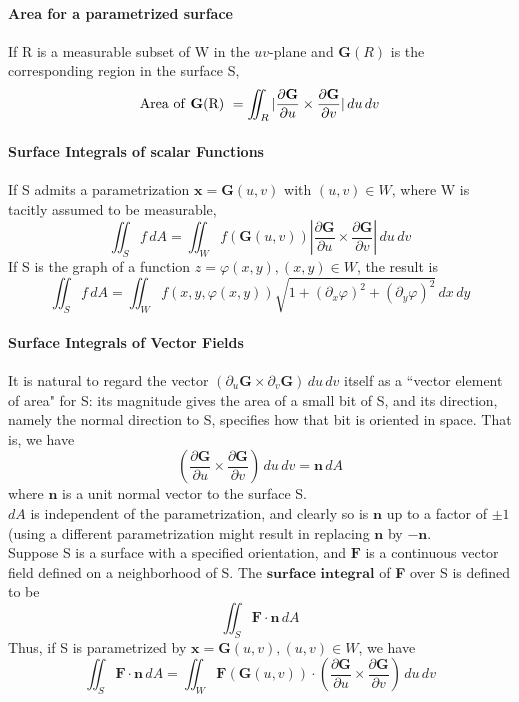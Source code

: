 \documentclass[11pt]{article}
\newcommand{\tb}[1]{\textbf{#1}}
\newcommand{\vx}[0]{\tb{x}}
\begin{document}
\paragraph{Area for a parametrized surface}
If R is a measurable subset of W in the $uv$-plane and $\tb{G}(R)$ is the corresponding region in the surface S,
$$\mbox{Area of \tb{G}(R) } = \iint_R|\frac{\partial \tb{G}}{\partial u} \times \frac{\partial \tb{G}}{\partial v}| \, du\, dv$$
\paragraph{Surface Integrals of scalar Functions}
If S admits a parametrization $\vx = \tb{G}(u,v)$ with $(u,v)\in W$, where W is tacitly assumed to be measurable,
$$\iint_S f \, dA = \iint_W f(\tb{G}(u,v))|\frac{\partial \tb{G}}{\partial u}\times \frac{\partial \tb{G}}{\partial v}| \, du\, dv$$
If S is the graph of a function $z = \varphi(x, y), (x,y) \in W$, the result is
$$\iint_S f\, dA = \iint_W f(x,y,\varphi(x,y))\sqrt{1+(\partial_x \varphi)^2 + (\partial_y \varphi)^2}\, dx \, dy$$
\paragraph{Surface Integrals of Vector Fields} It is natural to regard the vector $(\partial_u \tb{G} \times \partial_v \tb{G}) \, du \, dv$ itself as a ``vector element of area" for S: its magnitude gives the area of a small bit of S, and its direction, namely the normal direction to S, specifies how that bit is oriented in space. That is, we have
$$(\frac{\partial \tb{G}}{\partial u} \times \frac{\partial \tb{G}}{\partial v}) \, du \, dv = \tb{n}\, dA$$ where $\tb{n}$ is a unit normal vector to the surface S. \\
$dA$ is independent of the parametrization, and clearly so is $\tb{n}$ up to a factor of $\pm 1$ (using a different parametrization might result in replacing $\tb{n}$ by $-\tb{n}$. \\
Suppose S is a surface with a specified orientation, and $\tb{F}$ is a continuous vector field defined on a neighborhood of S. The $\tb{surface integral}$ of \tb{F} over S is defined to be $$\iint_S \tb{F}\cdot \tb{n}\, dA$$
Thus, if S is parametrized by $\vx = \tb{G}(u,v), (u,v)\in W$, we have
$$\iint_S \tb{F}\cdot \tb{n}\, dA = \iint_W \tb{F}(\tb{G}(u,v))\cdot (\frac{\partial \tb{G}}{\partial u} \times \frac{\partial \tb{G}}{\partial v}) \, du \, dv$$
\end{document}
